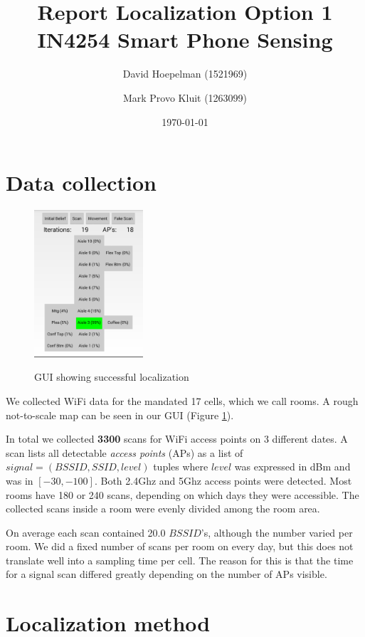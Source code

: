 \documentclass[a4paper,10pt,twoside]{IEEEtran}
\title{\huge{\textbf{Report Localization Option 1}\\IN4254 Smart Phone Sensing}}
\date{\today}
\author{David Hoepelman (1521969) \and Mark Provo Kluit (1263099)}
\begin{document}
\maketitle

\section{Data collection}
\label{sec:localization-method}

\begin{figure}
  \centering
    \includegraphics[width=0.36\textwidth]{screenshot}
    \label{fig:screenshot}
    \caption{GUI showing successful localization}
\end{figure}

We collected WiFi data for the mandated 17 cells, which we call rooms.
A rough not-to-scale map can be seen in our GUI (Figure \ref{fig:screenshot}).

In total we collected \textbf{3300} scans for WiFi access points on 3 different dates.
A scan lists all detectable \emph{access points} (APs) as a list of $signal=(BSSID, SSID, level)$ tuples where $level$ was expressed in dBm and was in $[-30,-100]$.
Both 2.4Ghz and 5Ghz access points were detected.
Most rooms have 180 or 240 scans, depending on which days they were accessible.
The collected scans inside a room were evenly divided among the room area.

On average each scan contained 20.0 $BSSID$'s, although the number varied per room.
We did a fixed number of scans per room on every day, but this does not translate well into a sampling time per cell.
The reason for this is that the time for a signal scan differed greatly depending on the number of APs visible.

\newpage

\section{Localization method}
\label{sec:data}
\end{document}
